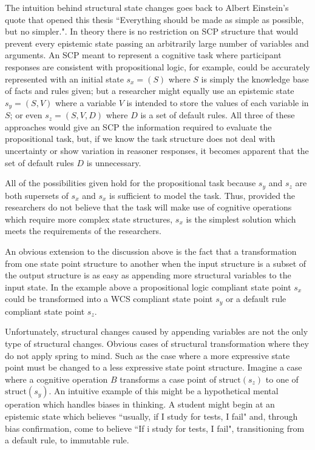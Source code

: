 {The intuition behind structural state changes goes back to Albert Einstein's quote that opened this thesis ``Everything should be made as simple as possible, but no simpler.". In theory there is no restriction on SCP structure that would prevent every epistemic state passing an arbitrarily large number of variables and arguments. An SCP meant to represent a cognitive task where participant responses are consistent with propositional logic, for example, could be accurately represented with an initial state $s_x=(S)$ where $S$ is simply the knowledge base of facts and rules given; but a researcher might equally use an epistemic state $s_y=(S,V)$ where a variable $V$ is intended to store the values of each variable in $S$; or even $s_z=(S,V,D)$ where $D$ is a set of default rules. All three of these approaches would give an SCP the information required to evaluate the propositional task, but, if we know the task structure does not deal with uncertainty or show variation in reasoner responses, it becomes apparent that the set of default rules $D$ is unnecessary.

All of the possibilities given hold for the propositional task because $s_y$ and $s_z$ are both supersets of $s_x$ and $s_x$ is sufficient to model the task. Thus, provided the researchers do not believe that the task will make use of cognitive operations which require more complex state structures, $s_x$ is the simplest solution which meets the requirements of the researchers.

An obvious extension to the discussion above is the fact that a transformation from one state point structure to another when the input structure is a subset of the output structure is as easy as appending more structural variables to the input state. In the example above a propositional logic compliant state point $s_x$ could be transformed into a WCS compliant state point $s_y$ or a default rule compliant state point $s_z$.

Unfortunately, structural changes caused by appending variables are not the only type of structural changes. Obvious cases of structural transformation where they do not apply spring to mind. Such as the case where a more expressive state point must be changed to a less expressive state point structure. Imagine a case where a cognitive operation $B$ transforms a case point of $\textrm{struct}(s_z)$ to one of $\textrm{struct}(s_y)$. An intuitive example of this might be a hypothetical mental operation which handles biases in thinking. A student might begin at an epistemic state which believes ``usually, if I study for tests, I fail" and, through bias confirmation, come to believe ``If i study for tests, I fail", transitioning from a default rule, to immutable rule. 

}
